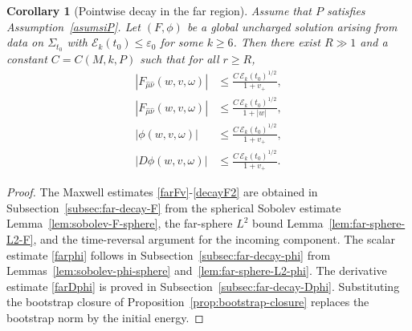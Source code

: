 \documentclass[11pt]{article}
\numberwithin{equation}{section}
\theoremstyle{plain}
\newtheorem{corollary}[theorem]{Corollary}
\theoremstyle{definition}
\theoremstyle{remark}
\newcommand{\vplus}{v_{+}}
\begin{document}
\begin{corollary}[Pointwise decay in the far region]\label{cor:far-decay}
Assume that $P$ satisfies Assumption~\ref{asumsiP}.
Let $(F,\phi)$ be a global uncharged solution arising from data on $\Sigma_{t_0}$ with $\mathcal{E}_k(t_0)\le \varepsilon_0$ for some $k\ge 6$.
Then there exist $R\gg 1$ and a constant $C=C(M,k,P)$ such that for all $r\ge R$,
\begin{eqnarray}
|F_{\hat\mu\hat\nu}(w,v,\omega)|
&\le \frac{C\,\mathcal{E}_k(t_0)^{1/2}}{1+\vplus},
\label{farFv}
\\
|F_{\hat\mu\hat\nu}(w,v,\omega)|
&\le \frac{C\,\mathcal{E}_k(t_0)^{1/2}}{1+|w|},
\label{decayF2}
\\
|\phi(w,v,\omega)|
&\le \frac{C\,\mathcal{E}_k(t_0)^{1/2}}{1+\vplus},
\label{farphi}
\\
|D\phi(w,v,\omega)|
&\le \frac{C\,\mathcal{E}_k(t_0)^{1/2}}{1+\vplus}.
\label{farDphi}
\end{eqnarray}
\end{corollary}
\begin{proof}
The Maxwell estimates \eqref{farFv}-\eqref{decayF2} are obtained in Subsection~\ref{subsec:far-decay-F} from the spherical Sobolev estimate Lemma~\ref{lem:sobolev-F-sphere}, the far-sphere $L^2$ bound Lemma~\ref{lem:far-sphere-L2-F}, and the time-reversal argument for the incoming component.  The scalar estimate \eqref{farphi} follows in Subsection~\ref{subsec:far-decay-phi} from Lemmas~\ref{lem:sobolev-phi-sphere} and~\ref{lem:far-sphere-L2-phi}.  The derivative estimate \eqref{farDphi} is proved in Subsection~\ref{subsec:far-decay-Dphi}.  Substituting the bootstrap closure of Proposition~\ref{prop:bootstrap-closure} replaces the bootstrap norm by the initial energy.
\end{proof}
\end{document}
